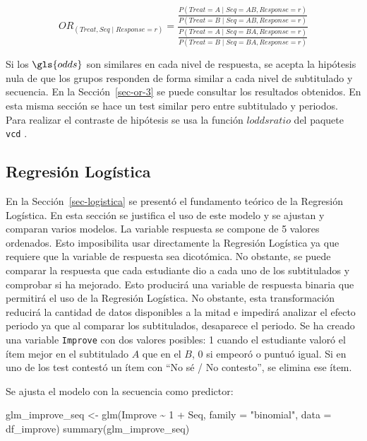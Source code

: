 \documentclass[
  12pt,
  a4paper,
  extrafontsizes,
  onecolumn,
  openright,
  table]{memoir}
\newenvironment{Shaded}{\begin{snugshade}}{\end{snugshade}}
\newcommand{\AttributeTok}[1]{\textcolor[rgb]{0.40,0.45,0.13}{#1}}
\newcommand{\DecValTok}[1]{\textcolor[rgb]{0.68,0.00,0.00}{#1}}
\newcommand{\FunctionTok}[1]{\textcolor[rgb]{0.28,0.35,0.67}{#1}}
\newcommand{\NormalTok}[1]{\textcolor[rgb]{0.00,0.23,0.31}{#1}}
\newcommand{\OtherTok}[1]{\textcolor[rgb]{0.00,0.23,0.31}{#1}}
\newcommand{\SpecialCharTok}[1]{\textcolor[rgb]{0.37,0.37,0.37}{#1}}
\newcommand{\StringTok}[1]{\textcolor[rgb]{0.13,0.47,0.30}{#1}}
\begin{document}
\[
OR_{(Treat, Seq \mid Response=r)}=\frac{
    \frac{
            P(Treat=A \mid Seq=AB, Response=r)
        }{
            P(Treat=B \mid Seq=AB, Response=r)
        }
    }
    {\frac{
        P(Treat=A \mid Seq=BA, Response=r)
        }{
        P(Treat=B \mid Seq=BA, Response=r)
    }
}
\]

Si los \(\gls{odds}\) son similares en cada nivel de respuesta, se
acepta la hipótesis nula de que los grupos responden de forma similar a
cada nivel de subtitulado y secuencia. En la Sección~\ref{sec-or-3} se
puede consultar los resultados obtenidos. En esta misma sección se hace
un test similar pero entre subtitulado y periodos. Para realizar el
contraste de hipótesis se usa la función \(loddsratio\) del paquete
\texttt{vcd} \autocite[ver][]{vcd}.

\hypertarget{sec-logistica-2}{%
\subsection{Regresión Logística}\label{sec-logistica-2}}

En la Sección~\ref{sec-logistica} se presentó el fundamento teórico de
la \gls{Regresión Logística}. En esta sección se justifica el uso de
este modelo y se ajustan y comparan varios modelos. La variable
respuesta se compone de 5 valores ordenados. Esto imposibilita usar
directamente la Regresión Logística ya que requiere que la variable de
respuesta sea dicotómica. No obstante, se puede comparar la respuesta
que cada estudiante dio a cada uno de los subtitulados y comprobar si ha
mejorado. Esto producirá una variable de respuesta binaria que permitirá
el uso de la Regresión Logística. No obstante, esta transformación
reducirá la cantidad de datos disponibles a la mitad e impedirá analizar
el \gls{efecto periodo} ya que al comparar los subtitulados, desaparece
el periodo. Se ha creado una variable \texttt{Improve} con dos valores
posibles: 1 cuando el estudiante valoró el ítem mejor en el subtitulado
\(A\) que en el \(B\), 0 si empeoró o puntuó igual. Si en uno de los
test contestó un ítem con \enquote{No sé / No contesto}, se elimina ese
ítem.

Se ajusta el modelo con la secuencia como predictor:

\scriptsize

\begin{Shaded}
\begin{Highlighting}[]
\NormalTok{glm\_improve\_seq }\OtherTok{\textless{}{-}} \FunctionTok{glm}\NormalTok{(Improve }\SpecialCharTok{\textasciitilde{}} \DecValTok{1} \SpecialCharTok{+}\NormalTok{ Seq, }\AttributeTok{family =} \StringTok{"binomial"}\NormalTok{, }\AttributeTok{data =}\NormalTok{ df\_improve)}
\FunctionTok{summary}\NormalTok{(glm\_improve\_seq)}
\end{Highlighting}
\end{Shaded}
\end{document}
